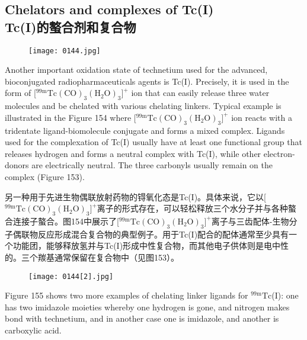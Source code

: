 \documentclass[dvipsnames, svgnames,a4paper,11pt]{article}
\begin{document}
\subsection{Chelators and complexes of Tc(I) \\Tc(I)的螯合剂和复合物}
\begin{figure}[h]
	\centering
    \texttt{[image: 0144.jpg]}    
     \label{fig153}
\end{figure}

Another important oxidation state of technetium used for the advanced,
bioconjugated radiopharmaceuticals agents is Tc(I). Precisely, it is used in the form
of [${}^\mathrm{99m}\mathrm{Tc(CO)_3(H_2O)_3]^+}$ ion that can easily release three water molecules and be
chelated with various chelating linkers. Typical example is illustrated in the Figure
154 where [${}^\mathrm{99m}\mathrm{Tc(CO)_3(H_2O)_3]^+}$ ion reacts with a tridentate ligand-biomolecule
conjugate and forms a mixed complex. Ligands used for the complexation of Tc(I)
usually have at least one functional group that releases hydrogen and forms a
neutral complex with Tc(I), while other electron-donors are electrically neutral. The
three carbonyls usually remain on the complex (Figure 153).

另一种用于先进生物偶联放射药物的锝氧化态是Tc(I)。具体来说，它以[${}^\mathrm{99m}\mathrm{Tc(CO)_3(H_2O)_3]^+}$离子的形式存在，可以轻松释放三个水分子并与各种螯合连接子螯合。图154中展示了[${}^\mathrm{99m}\mathrm{Tc(CO)_3(H_2O)_3]^+}$离子与三齿配体-生物分子偶联物反应形成混合复合物的典型例子。用于Tc(I)配合的配体通常至少具有一个功能团，能够释放氢并与Tc(I)形成中性复合物，而其他电子供体则是电中性的。三个羰基通常保留在复合物中（见图153）。

\begin{figure}[h]
	\centering
    \texttt{[image: 0144[2].jpg]}    
     \label{fig154}
\end{figure}

Figure 155 shows two more examples of chelating linker ligands for ${}^\mathrm{99m}\mathrm{Tc}$(I): one has
two imidazole moieties whereby one hydrogen is gone, and nitrogen makes bond
with technetium, and in another case one is imidazole, and another is carboxylic acid.
\end{document}
